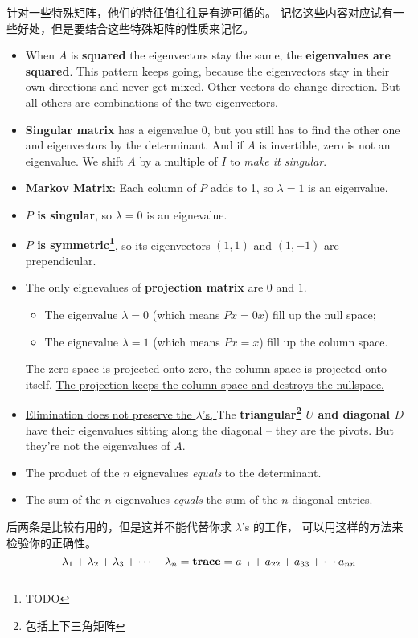 针对一些特殊矩阵，他们的特征值往往是有迹可循的。
记忆这些内容对应试有一些好处，但是要结合这些特殊矩阵的性质来记忆。
\begin{itemize}
    \item When $A$ is \textbf{squared} the eigenvectors stay the same, the \textbf{eigenvalues are squared}.
        This pattern keeps going, because the eigenvectors stay in their own directions and never get mixed.
        Other vectors do change direction. But all others are combinations of the two eigenvectors.
    \item \textbf{Singular matrix} has a eigenvalue $0$, 
        but you still has to find the other one and eigenvectors 
        by the determinant. And if $A$ is invertible, zero is not an eigenvalue.
        We shift $A$ by a multiple of $I$ to \emph{make it singular}.
    \item \textbf{Markov Matrix}: Each column of $P$ adds to 1, so $\lambda = 1$ is an eigenvalue.
    \item \textbf{$P$ is singular}, so $\lambda = 0$ is an eignevalue. 
    \item \textbf{$P$ is symmetric\footnote{TODO}}, so its eigenvectors $(1, 1)$ and $(1, -1)$ are prependicular.
    \item The only eignevalues of \textbf{projection matrix} are $0$ and $1$. 
        \begin{itemize}
            \item The eigenvalue $\lambda = 0$ (which means $Px = 0x$) fill up the null space;
            \item The eignevalue $\lambda = 1$ (which means $Px = x$)  fill up the column space.
        \end{itemize}
        The zero space is projected onto zero, the column space is projected onto itself.
        \uline{The projection keeps the column space and destroys the nullspace.}
    \item \uline{Elimination does not preserve the $\lambda$'s, }
        The \textbf{triangular\footnote{包括上下三角矩阵} $U$ and diagonal $D$} 
        have their eigenvalues sitting along the diagonal 
        -- they are the pivots. But they're not the eigenvalues of $A$.
    \item The product of the $n$ eignevalues \emph{equals} to the determinant. 
    \item The sum of the $n$ eigenvalues \emph{equals} the sum of the $n$ diagonal entries.
\end{itemize}
后两条是比较有用的，但是这并不能代替你求 $\lambda$'s 的工作，
可以用这样的方法来检验你的正确性。
\[
    \lambda_1 + 
    \lambda_2 + 
    \lambda_3 + 
    \cdots + 
    \lambda_n = 
    \mbox{\textbf{trace}} = 
    a_{11} + 
    a_{22} + 
    a_{33} + 
    \cdots
    a_{nn} 
\]

